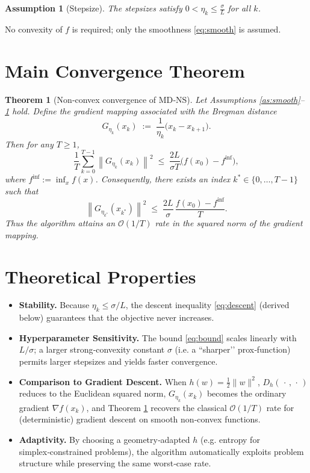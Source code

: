 \documentclass[11pt]{article}
\newtheorem{theorem}{Theorem}
\newtheorem{assumption}{Assumption}
\newcommand{\norm}[1]{\left\lVert#1\right\rVert}
\newcommand{\D}[2]{D_{h}(#1,#2)}
\begin{document}
\begin{assumption}[Stepsize]
\label{as:stepsize}
The stepsizes satisfy $0<\eta_{k}\le \frac{\sigma}{L}$ for all $k$.
\end{assumption}

No convexity of $f$ is required; only the smoothness \eqref{eq:smooth} is assumed.

\section*{Main Convergence Theorem}
\begin{theorem}[Non‑convex convergence of MD‑NS]
\label{thm:main}
Let Assumptions \ref{as:smooth}–\ref{as:stepsize} hold. Define the \emph{gradient mapping} associated with the Bregman distance
\[
G_{\eta_{k}}(x_{k})\;:=\;\frac{1}{\eta_{k}}\bigl(x_{k}-x_{k+1}\bigr).
\]
Then for any $T\ge 1$,
\begin{equation}
\label{eq:bound}
\frac{1}{T}\sum_{k=0}^{T-1}\norm{G_{\eta_{k}}(x_{k})}^{2}
\;\le\;
\frac{2L}{\sigma T}\bigl(f(x_{0})-f^{\inf}\bigr),
\end{equation}
where $f^{\inf}:=\inf_{x}f(x)$. Consequently, there exists an index $k^{*}\in\{0,\dots,T-1\}$ such that
\[
\norm{G_{\eta_{k^{*}}}(x_{k^{*}})}^{2}
\;\le\;
\frac{2L}{\sigma}\,\frac{f(x_{0})-f^{\inf}}{T}.
\]
Thus the algorithm attains an $\mathcal{O}(1/T)$ rate in the squared norm of the gradient mapping.
\end{theorem}

\section*{Theoretical Properties}
\begin{itemize}[leftmargin=*]
\item \textbf{Stability.} Because $\eta_{k}\le\sigma/L$, the descent inequality \eqref{eq:descent} (derived below) guarantees that the objective never increases.
\item \textbf{Hyperparameter Sensitivity.} The bound \eqref{eq:bound} scales linearly with $L/\sigma$; a larger strong‑convexity constant $\sigma$ (i.e. a “sharper’’ prox‑function) permits larger stepsizes and yields faster convergence.
\item \textbf{Comparison to Gradient Descent.} When $h(w)=\tfrac12\|w\|^{2}$, $\D{\,\cdot\,}{\,\cdot\,}$ reduces to the Euclidean squared norm, $G_{\eta_{k}}(x_{k})$ becomes the ordinary gradient $\nabla f(x_{k})$, and Theorem \ref{thm:main} recovers the classical $\mathcal{O}(1/T)$ rate for (deterministic) gradient descent on smooth non‑convex functions.
\item \textbf{Adaptivity.} By choosing a geometry‑adapted $h$ (e.g. entropy for simplex‑constrained problems), the algorithm automatically exploits problem structure while preserving the same worst‑case rate.
\end{itemize}
\end{document}
